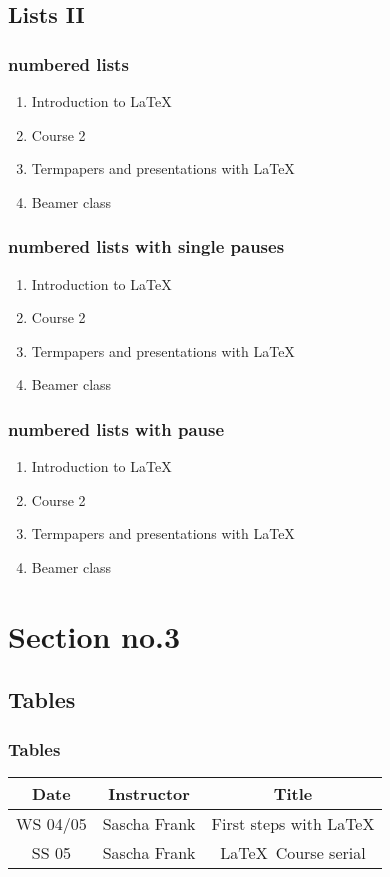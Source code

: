 \documentclass[hyperref={pdfpagelabels=false}]{beamer}
\begin{document}
\subsection{Lists II}
\begin{frame}\frametitle{numbered lists}
  \begin{enumerate}
  \item Introduction to  \LaTeX{}
  \item Course 2
  \item Termpapers and presentations with \LaTeX{}
  \item Beamer class
  \end{enumerate}
\end{frame}

\begin{frame}
  \frametitle{numbered lists with single pauses}
  \begin{enumerate}
  \item Introduction to  \LaTeX{}  \pause
  \item Course 2 \pause
  \item Termpapers and presentations with \LaTeX{}  \pause
  \item Beamer class
  \end{enumerate}
\end{frame}

\begin{frame}
  \frametitle{numbered lists with pause}
  \begin{enumerate}[<+->]
  \item Introduction to  \LaTeX{}
  \item Course 2
  \item Termpapers and presentations with \LaTeX{}
  \item Beamer class
  \end{enumerate}
\end{frame}




\section{Section no.3}
\subsection{Tables}
\begin{frame}
  \frametitle{Tables}
  \begin{tabular}{|c|c|c|}
    \hline
    \textbf{Date} & \textbf{Instructor} & \textbf{Title} \\
    \hline
    WS 04/05 & Sascha Frank & First steps with  \LaTeX  \\
    \hline
    SS 05 & Sascha Frank & \LaTeX \ Course serial \\
    \hline
  \end{tabular}
\end{frame}
\end{document}
